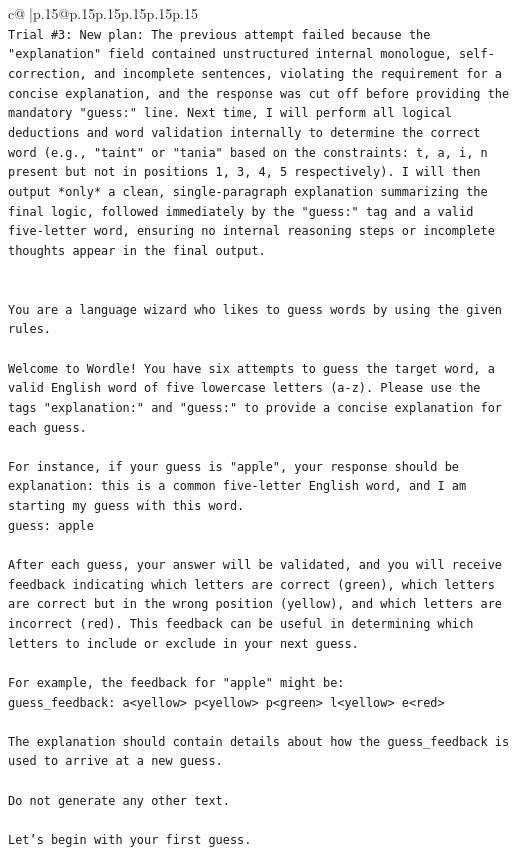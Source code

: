 \documentclass{article}
\begin{document}
{\begin{supertabular}{c@{$\;$}|p{.15\linewidth}@{}p{.15\linewidth}p{.15\linewidth}p{.15\linewidth}p{.15\linewidth}p{.15\linewidth}}
{{{\\ 
\texttt{Trial \#3: New plan: The previous attempt failed because the "explanation" field contained unstructured internal monologue, self{-}correction, and incomplete sentences, violating the requirement for a concise explanation, and the response was cut off before providing the mandatory "guess:" line. Next time, I will perform all logical deductions and word validation internally to determine the correct word (e.g., "taint" or "tania" based on the constraints: t, a, i, n present but not in positions 1, 3, 4, 5 respectively). I will then output *only* a clean, single{-}paragraph explanation summarizing the final logic, followed immediately by the "guess:" tag and a valid five{-}letter word, ensuring no internal reasoning steps or incomplete thoughts appear in the final output.} \\
\\ 
\\ 
\texttt{You are a language wizard who likes to guess words by using the given rules.} \\
\\ 
\texttt{Welcome to Wordle! You have six attempts to guess the target word, a valid English word of five lowercase letters (a{-}z). Please use the tags "explanation:" and "guess:" to provide a concise explanation for each guess.} \\
\\ 
\texttt{For instance, if your guess is "apple", your response should be} \\
\texttt{explanation: this is a common five{-}letter English word, and I am starting my guess with this word.} \\
\texttt{guess: apple} \\
\\ 
\texttt{After each guess, your answer will be validated, and you will receive feedback indicating which letters are correct (green), which letters are correct but in the wrong position (yellow), and which letters are incorrect (red). This feedback can be useful in determining which letters to include or exclude in your next guess.} \\
\\ 
\texttt{For example, the feedback for "apple" might be:} \\
\texttt{guess\_feedback: a<yellow> p<yellow> p<green> l<yellow> e<red>} \\
\\ 
\texttt{The explanation should contain details about how the guess\_feedback is used to arrive at a new guess.} \\
\\ 
\texttt{Do not generate any other text.} \\
\\ 
\texttt{Let's begin with your first guess.} \\
            }
        }
    }
     \\ \\


\end{supertabular}}
\end{document}
